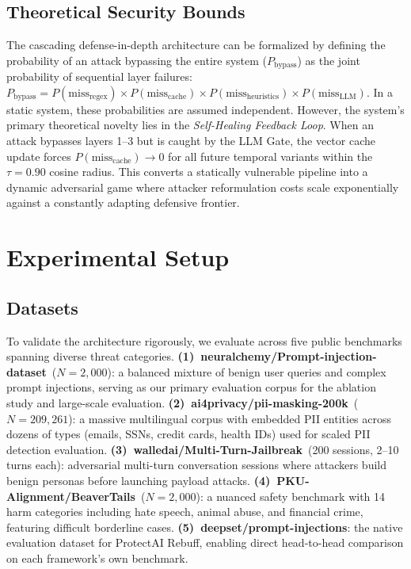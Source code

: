 \documentclass[conference]{IEEEtran}
\begin{document}
\subsection{Theoretical Security Bounds}
The cascading defense-in-depth architecture can be formalized by defining the probability of an attack bypassing the entire system ($P_{\text{bypass}}$) as the joint probability of sequential layer failures: $P_{\text{bypass}} = P(\text{miss}_{\text{regex}}) \times P(\text{miss}_{\text{cache}}) \times P(\text{miss}_{\text{heuristics}}) \times P(\text{miss}_{\text{LLM}})$. In a static system, these probabilities are assumed independent. However, the system's primary theoretical novelty lies in the \textit{Self-Healing Feedback Loop}. When an attack bypasses layers 1--3 but is caught by the LLM Gate, the vector cache update forces $P(\text{miss}_{\text{cache}}) \to 0$ for all future temporal variants within the $\tau=0.90$ cosine radius. This converts a statically vulnerable pipeline into a dynamic adversarial game where attacker reformulation costs scale exponentially against a constantly adapting defensive frontier.

\section{Experimental Setup}

\subsection{Datasets}

To validate the architecture rigorously, we evaluate across five
public benchmarks spanning diverse threat categories.
\textbf{(1)~neuralchemy/Prompt-injection-dataset}~($N{=}2{,}000$):
a balanced mixture of benign user queries and complex prompt
injections, serving as our primary evaluation corpus for the ablation study and
large-scale evaluation.
\textbf{(2)~ai4privacy/pii-masking-200k}~($N{=}209{,}261$): a
massive multilingual corpus with embedded PII entities across dozens
of types (emails, SSNs, credit cards, health IDs) used for scaled
PII detection evaluation.
\textbf{(3)~walledai/Multi-Turn-Jailbreak}~(200 sessions, 2--10
turns each): adversarial multi-turn conversation sessions where
attackers build benign personas before launching payload attacks.
\textbf{(4)~PKU-Alignment/BeaverTails}~($N{=}2{,}000$): a nuanced
safety benchmark with 14 harm categories including hate speech,
animal abuse, and financial crime, featuring difficult borderline
cases.
\textbf{(5)~deepset/prompt-injections}: the
native evaluation dataset for ProtectAI
Rebuff, enabling direct
head-to-head comparison on each framework's own benchmark.
\end{document}
